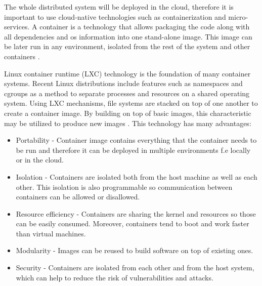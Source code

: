 The whole distributed system will be deployed in the cloud, therefore it is important to use cloud-native technologies such as containerization and micro-services. A container is a technology that allows packaging the code along with all dependencies and os information into one stand-alone image. This image can be later run in any environment, isolated from the rest of the system and other containers \cite{container_technologies}.

 Linux container runtime (LXC) \cite{linux_containers} technology is the foundation of many container systems. Recent Linux distributions include features such as namespaces and cgroups as a method to separate processes and resources on a shared operating system. Using LXC mechanisms, file systems are stacked on top of one another to create a container image. By building on top of basic images, this characteristic may be utilized to produce new images \cite{container_technologies}. This technology has many advantages:
\begin{itemize}
    \item Portability - Container image contains everything that the container needs to be run and therefore it can be deployed in multiple environments f.e locally or in the cloud.

    \item  Isolation - Containers are isolated both from the host machine as well as each other. This isolation is also programmable so communication between containers can be allowed or disallowed.

    \item Resource efficiency - Containers are sharing the kernel and resources so those can be easily consumed. Moreover, containers tend to boot and work faster than virtual machines.
    
    \item Modularity - Images can be reused to build software on top of existing ones.
    
    \item Security - Containers are isolated from each other and from the host system, which can help to reduce the risk of vulnerabilities and attacks.
\end{itemize}